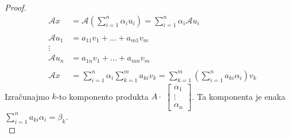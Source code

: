 \documentclass[a4paper,12pt]{article}
\begin{document}
\begin{proof}
	\begin{align*}
	\mathcal{A}x &=\mathcal{A}(\sum_{i=1}^n\alpha_iu_i)=\sum_{i=1}^n\alpha_i\mathcal{A}u_i \\
	& \\
	\mathcal{A}u_1&=a_{11}v_1+\ldots+a_{m1}v_m \\
	\vdots & \\
	\mathcal{A}u_n&=a_{1n}v_1+\ldots+a_{mn}v_m \\
	& \\
	\mathcal{A}x&= \sum_{i=1}^n \alpha_i \sum_{k=1}^m a_{ki}v_k = \sum_{k=1}^m (\sum_{i=1}^n a_{ki}\alpha_i)v_k
	\end{align*}
	Izračunajmo $k$-to komponento produkta 
    $A \cdot $
    $\begin{bmatrix}
		\alpha_1 \\ 
		\vdots \\ 
		\alpha_n
	\end{bmatrix}$. Ta komponenta je enaka $\sum_{i=1}^n a_{ki}\alpha_i=\beta_k$. \\
\end{proof}
\end{document}
